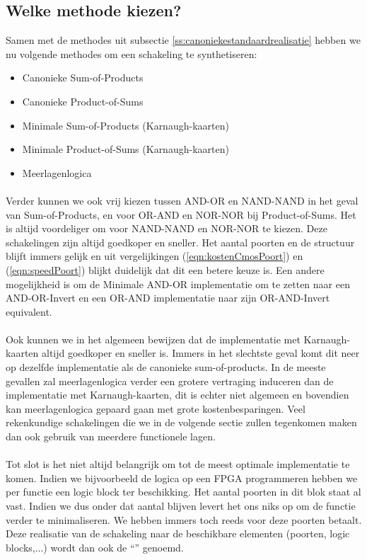 \subsection{Welke methode kiezen?}
Samen met de methodes uit subsectie \ref{ss:canoniekestandaardrealisatie} hebben we nu volgende methodes om een schakeling te synthetiseren:
\begin{itemize}
 \item Canonieke Sum-of-Products
 \item Canonieke Product-of-Sums
 \item Minimale Sum-of-Products (Karnaugh-kaarten)
 \item Minimale Product-of-Sums (Karnaugh-kaarten)
 \item Meerlagenlogica
\end{itemize}
\paragraph{}Verder kunnen we ook vrij kiezen tussen AND-OR en NAND-NAND in het geval van Sum-of-Products, en voor OR-AND en NOR-NOR bij Product-of-Sums. Het is altijd voordeliger om voor NAND-NAND en NOR-NOR te kiezen. Deze schakelingen zijn altijd goedkoper en sneller. Het aantal poorten en de structuur blijft immers gelijk en uit vergelijkingen (\ref{eqn:kostenCmosPoort}) en (\ref{eqn:speedPoort}) blijkt duidelijk dat dit een betere keuze is. Een andere mogelijkheid is om de Minimale AND-OR implementatie om te zetten naar een AND-OR-Invert en een OR-AND implementatie naar zijn OR-AND-Invert equivalent.
\paragraph{}Ook kunnen we in het algemeen bewijzen dat de implementatie met Karnaugh-kaarten altijd goedkoper en sneller is. Immers in het slechtste geval komt dit neer op dezelfde implementatie als de canonieke sum-of-products. In de meeste gevallen zal meerlagenlogica verder een grotere vertraging induceren dan de implementatie met Karnaugh-kaarten, dit is echter niet algemeen en bovendien kan meerlagenlogica gepaard gaan met grote kostenbesparingen. Veel rekenkundige schakelingen die we in de volgende sectie zullen tegenkomen maken dan ook gebruik van meerdere functionele lagen.
\paragraph{}Tot slot is het niet altijd belangrijk om tot de meest optimale implementatie te komen. Indien we bijvoorbeeld de logica op een FPGA programmeren hebben we per functie een logic block ter beschikking. Het aantal poorten in dit blok staat al vast. Indien we dus onder dat aantal blijven levert het ons niks op om de functie verder te minimaliseren. We hebben immers toch reeds voor deze poorten betaalt. Deze realisatie van de schakeling naar de beschikbare elementen (poorten, logic blocks,...) wordt dan ook de ``'' genoemd.
